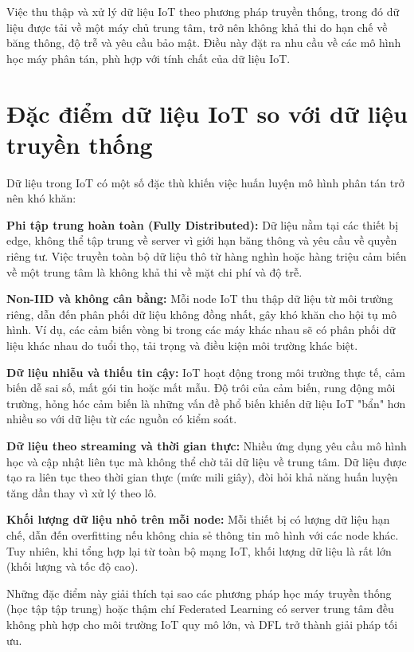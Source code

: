 Việc thu thập và xử lý dữ liệu IoT theo phương pháp truyền thống, trong đó dữ liệu được tải về một máy chủ trung tâm, trở nên không khả thi do hạn chế về băng thông, độ trễ và yêu cầu bảo mật. Điều này đặt ra nhu cầu về các mô hình học máy phân tán, phù hợp với tính chất của dữ liệu IoT.

\section{Đặc điểm dữ liệu IoT so với dữ liệu truyền thống}

\hspace{0.6cm}Dữ liệu trong IoT có một số đặc thù khiến việc huấn luyện mô hình phân tán trở nên khó khăn:

\textbf{Phi tập trung hoàn toàn (Fully Distributed):}  
Dữ liệu nằm tại các thiết bị edge, không thể tập trung về server vì giới hạn băng thông và yêu cầu về quyền riêng tư. Việc truyền toàn bộ dữ liệu thô từ hàng nghìn hoặc hàng triệu cảm biến về một trung tâm là không khả thi về mặt chi phí và độ trễ.

\textbf{Non-IID và không cân bằng:}  
Mỗi node IoT thu thập dữ liệu từ môi trường riêng, dẫn đến phân phối dữ liệu không đồng nhất, gây khó khăn cho hội tụ mô hình. Ví dụ, các cảm biến vòng bi trong các máy khác nhau sẽ có phân phối dữ liệu khác nhau do tuổi thọ, tải trọng và điều kiện môi trường khác biệt.

\textbf{Dữ liệu nhiễu và thiếu tin cậy:}  
IoT hoạt động trong môi trường thực tế, cảm biến dễ sai số, mất gói tin hoặc mất mẫu. Độ trôi của cảm biến, rung động môi trường, hỏng hóc cảm biến là những vấn đề phổ biến khiến dữ liệu IoT "bẩn" hơn nhiều so với dữ liệu từ các nguồn có kiểm soát.

\textbf{Dữ liệu theo streaming và thời gian thực:}  
Nhiều ứng dụng yêu cầu mô hình học và cập nhật liên tục mà không thể chờ tải dữ liệu về trung tâm. Dữ liệu được tạo ra liên tục theo thời gian thực (mức mili giây), đòi hỏi khả năng huấn luyện tăng dần thay vì xử lý theo lô.

\textbf{Khối lượng dữ liệu nhỏ trên mỗi node:}  
Mỗi thiết bị có lượng dữ liệu hạn chế, dẫn đến overfitting nếu không chia sẻ thông tin mô hình với các node khác. Tuy nhiên, khi tổng hợp lại từ toàn bộ mạng IoT, khối lượng dữ liệu là rất lớn (khối lượng và tốc độ cao).

Những đặc điểm này giải thích tại sao các phương pháp học máy truyền thống (học tập tập trung) hoặc thậm chí Federated Learning có server trung tâm đều không phù hợp cho môi trường IoT quy mô lớn, và DFL trở thành giải pháp tối ưu.

